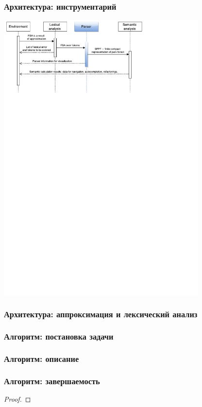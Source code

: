 \documentclass{beamer}
\begin{document}
\begin{frame}
    \transwipe[direction=90]
    \frametitle{Архитектура: инструментарий}
    \begin{center}
        \includegraphics[width=300pt]{pictures/Seq.pdf}
    \end{center}
\end{frame}

\begin{frame}
    \transwipe[direction=90]
    \frametitle{Архитектура: аппроксимация и лексический анализ}    
\end{frame}

\begin{frame}
    \transwipe[direction=90]
    \frametitle{Алгоритм: постановка задачи}
\end{frame}

\begin{frame}
    \transwipe[direction=90]
    \frametitle{Алгоритм: описание}
\end{frame}

\begin{frame}
    \transwipe[direction=90]
    \frametitle{Алгоритм: завершаемость}
    \begin{theorem}


    \end{theorem}

    \begin{proof}


    \end{proof}

\end{frame}
\end{document}
